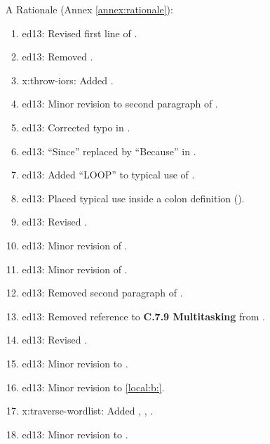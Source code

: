 \begin{itemize}
	\item[A] Rationale (Annex \ref{annex:rationale}):				%
		\begin{enumerate}
		\item \textsf{ed13}: Revised first line of .
		\item \textsf{ed13}: Removed .
		\item \textsf{x:throw-iors}: Added .
		\item \textsf{ed13}: Minor revision to second paragraph of .
		\item \textsf{ed13}: Corrected typo in .
		\item \textsf{ed13}: ``Since'' replaced by ``Because'' in .
		\item \textsf{ed13}: Added ``LOOP'' to typical use of .
		\item \textsf{ed13}: Placed typical use inside a colon definition ().
		\item \textsf{ed13}: Revised .
		\item \textsf{ed13}: Minor revision of .
		\item \textsf{ed13}: Minor revision of .
		\item \textsf{ed13}: Removed second paragraph of .
		\item \textsf{ed13}: Removed reference to \textbf{C.7.9 Multitasking} from .

		\item \textsf{ed13}: Revised .

		\item \textsf{ed13}: Minor revision to .

		\item \textsf{ed13}: Minor revision to \ref{local:b:}{}.

		\item \textsf{x:traverse-wordlist}:
			Added ,
			,
			.

		\item \textsf{ed13}: Minor revision to .
		\end{enumerate}


\end{itemize}
